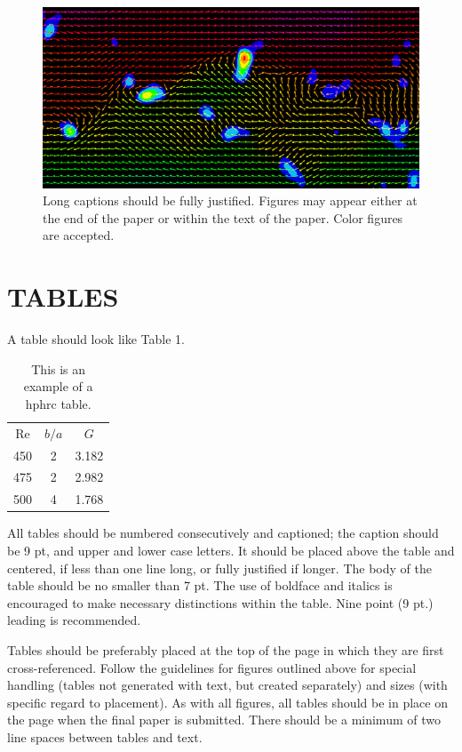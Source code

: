 \documentclass[twocolumn,10pt]{hphrc}
\begin{document}
	\begin{figure}
	\centering
	\includegraphics[width=5in]{SampleImage2}
	\caption{Long captions should be fully justified. Figures may appear either at the end of the paper or within the text of the paper.  Color figures are accepted.}
	\label{figure2}
	\end{figure}


\section*{TABLES}

A table should look like Table 1.

\begin{table}[ht]
\centering
\caption{This is an example of a hphrc table.}
\label{Table1}
\begin{tabular}{c c c}
& & \\ %
\hline
\hline
Re	& $b/a$	& $G$ \\
\hline
450	& 2	& 3.182 \\
475	& 2	& 2.982 \\
500	& 4	& 1.768 \\
\hline
\hline
\end{tabular}
\end{table}

All tables should be numbered consecutively and captioned; the caption should be 9 pt, and upper and lower case letters. It should be placed above the table and centered, if less than one line long, or fully justified if longer. The body of the table should be no smaller than 7 pt. The use of boldface and italics is encouraged to make necessary distinctions within the table. Nine point (9 pt.) leading is recommended.

Tables should be preferably placed at the top of the page in which they are first cross-referenced. Follow the guidelines for figures outlined above for special handling (tables not generated with text, but created separately) and sizes (with specific regard to placement). As with all figures, all tables should be in place on the page when the final paper is submitted. There should be a minimum of two line spaces between tables and text.
\end{document}

